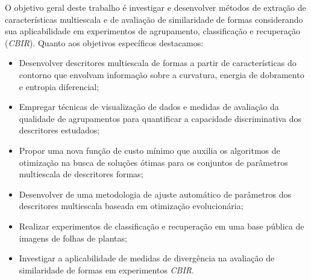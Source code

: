 





O objetivo geral deste trabalho é investigar e desenvolver métodos de extração de características multiescala e de avaliação de similaridade de formas considerando sua aplicabilidade em experimentos de agrupamento, classificação e recuperação (\emph{CBIR}). Quanto aos objetivos específicos destacamos:

\begin{itemize}
\item Desenvolver descritores multiescala de formas a partir de características do contorno que envolvam informação sobre a curvatura, energia de dobramento e entropia diferencial;

\item Empregar técnicas de visualização de dados e medidas de avaliação da qualidade de agrupamentos para quantificar a capacidade discriminativa dos descritores estudados; 


\item Propor uma nova função de custo mínimo que auxilia os algoritmos de otimização na busca de soluções ótimas para os conjuntos de parâmetros multiescala de descritores formas;

\item Desenvolver de uma metodologia de ajuste automático de parâmetros dos descritores multiescala baseada em otimização evolucionária;

\item Realizar experimentos de classificação e recuperação em uma base pública de imagens de folhas de plantas;

\item Investigar a aplicabilidade de medidas de divergência na avaliação de similaridade de formas em experimentos \emph{CBIR}.
\end{itemize}


